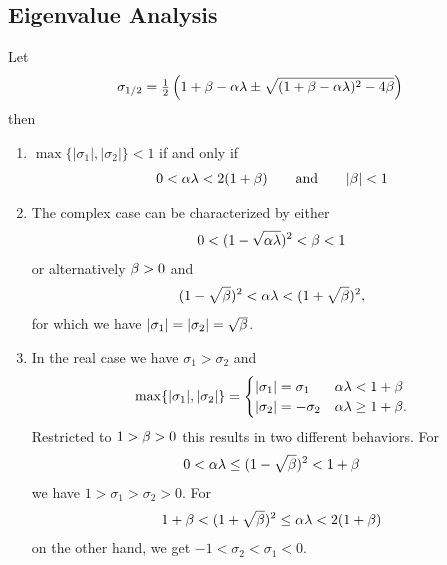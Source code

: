 \subsection{Eigenvalue Analysis}

\begin{theorem}
	\label{thm-appdx: momentum - stable set of parameters}
	Let
	\begin{align*}
		\sigma_{1/2}
		= \tfrac12 \left(
			1+\beta-\alpha\lambda \pm \sqrt{(1+\beta-\alpha\lambda)^2 - 4\beta}
		\right)
	\end{align*}
	then 
	\begin{enumerate}
		\item \(\max\{|\sigma_1|,|\sigma_2|\}<1\) if and only if
		\begin{align*}
			0<\alpha\lambda < 2(1+\beta) \qquad \text{and} \qquad |\beta|<1
		\end{align*}
		\item The complex case can be characterized by either
		\begin{align*}
			0<(1-\sqrt{\alpha\lambda})^2 < \beta < 1
		\end{align*}		
		or alternatively \(\beta>0\) and
		\begin{align*}
			(1-\sqrt{\beta})^2 < \alpha\lambda < (1+\sqrt{\beta})^2,
		\end{align*}
		for which we have \(|\sigma_1|=|\sigma_2|=\sqrt{\beta}\).
		
		\item In the real case we have \(\sigma_1>\sigma_2\) and
		\begin{align}\label{eq: when does sigma_1 or sigma_2 dominate?}
			\max\{|\sigma_1|, |\sigma_2|\} = \begin{cases}
				|\sigma_1|=\sigma_1 & \alpha\lambda < 1+\beta \\
				|\sigma_2|=-\sigma_2 & \alpha\lambda \ge 1+\beta.
			\end{cases}
		\end{align}
		Restricted to \(1>\beta>0\) this results in two different	
		behaviors. For
		\begin{align*}
			0<\alpha\lambda \le (1-\sqrt{\beta})^2 < 1+\beta
		\end{align*}
		we have \(1>\sigma_1 > \sigma_2 > 0\). For
		\begin{align*}
			1+\beta < (1+\sqrt{\beta})^2\le \alpha\lambda < 2(1+\beta)
		\end{align*}
		on the other hand, we get \(-1 < \sigma_2 < \sigma_1 < 0\).
	\end{enumerate}
\end{theorem}
